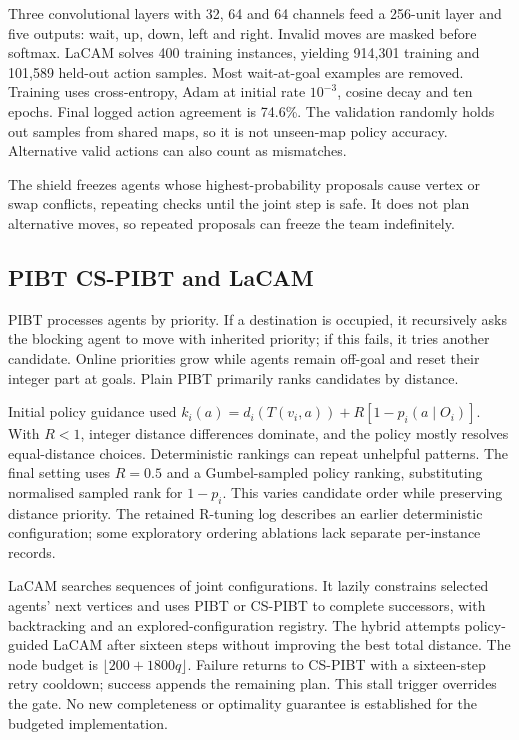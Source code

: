 \documentclass[10pt,a4paper]{article}
\begin{document}
Three convolutional layers with 32, 64 and 64 channels feed a 256-unit layer and five outputs: wait, up, down, left and right. Invalid moves are masked before softmax. LaCAM solves 400 training instances, yielding 914,301 training and 101,589 held-out action samples. Most wait-at-goal examples are removed. Training uses cross-entropy, Adam at initial rate $10^{-3}$, cosine decay and ten epochs. Final logged action agreement is 74.6\%. The validation randomly holds out samples from shared maps, so it is not unseen-map policy accuracy. Alternative valid actions can also count as mismatches.

The shield freezes agents whose highest-probability proposals cause vertex or swap conflicts, repeating checks until the joint step is safe. It does not plan alternative moves, so repeated proposals can freeze the team indefinitely.

\subsection{PIBT CS-PIBT and LaCAM}
PIBT processes agents by priority. If a destination is occupied, it recursively asks the blocking agent to move with inherited priority; if this fails, it tries another candidate. Online priorities grow while agents remain off-goal and reset their integer part at goals. Plain PIBT primarily ranks candidates by distance.

Initial policy guidance used $k_i(a)=d_i(T(v_i,a))+R[1-p_i(a\mid O_i)]$. With $R<1$, integer distance differences dominate, and the policy mostly resolves equal-distance choices. Deterministic rankings can repeat unhelpful patterns. The final setting uses $R=0.5$ and a Gumbel-sampled policy ranking, substituting normalised sampled rank for $1-p_i$. This varies candidate order while preserving distance priority. The retained R-tuning log describes an earlier deterministic configuration; some exploratory ordering ablations lack separate per-instance records.

LaCAM searches sequences of joint configurations. It lazily constrains selected agents' next vertices and uses PIBT or CS-PIBT to complete successors, with backtracking and an explored-configuration registry. The hybrid attempts policy-guided LaCAM after sixteen steps without improving the best total distance. The node budget is $\lfloor200+1800q\rfloor$. Failure returns to CS-PIBT with a sixteen-step retry cooldown; success appends the remaining plan. This stall trigger overrides the gate. No new completeness or optimality guarantee is established for the budgeted implementation.
\end{document}
